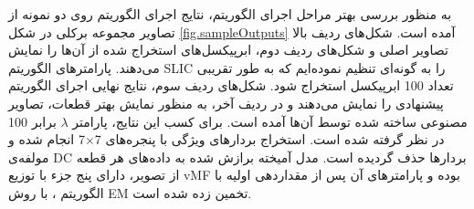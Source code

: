 به منظور بررسی بهتر مراحل اجرای الگوریتم،
نتایج اجرای الگوریتم روی دو نمونه از تصاویر مجموعه برکلی در شکل
\ref{fig.sampleOutputs}
آمده است.
شکل‌های ردیف بالا تصاویر اصلی و
شکل‌های ردیف دوم، ابرپیکسل‌های استخراج شده از آن‌ها را نمایش می‌دهند.
پارامترهای الگوریتم SLIC را به گونه‌ای تنظیم نموده‌ایم که به طور تقریبی تعداد 100 ابرپیکسل استخراج شود.
شکل‌های ردیف سوم، نتایج نهایی اجرای الگوریتم پیشنهادی را نمایش می‌دهند و در ردیف آخر، به منظور نمایش بهتر قطعات، تصاویر مصنوعی ساخته شده توسط آن‌ها آمده است.
برای کسب این نتایج، پارامتر
$\lambda$
برابر 100 در نظر گرفته شده است.
استخراج بردارهای ویژگی با پنجره‌های
7$\times$7
انجام شده و مولفه‌ی DC بردارها حذف گردیده است.
مدل آمیخته برازش شده به داده‌های هر قطعه از تصویر، دارای پنج جزء با توزیع vMF بوده و پارامترهای آن پس از مقداردهی اولیه با الگوریتم
،
با روش EM تخمین زده شده است.


